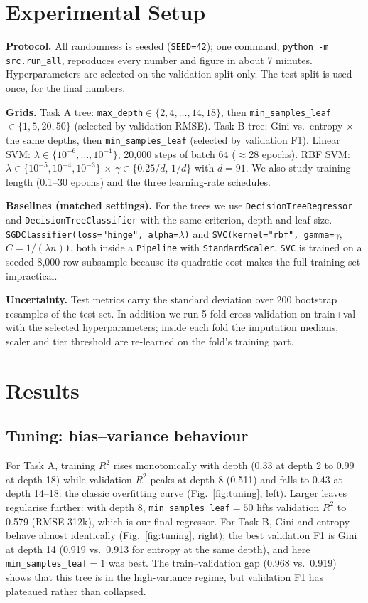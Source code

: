 \documentclass[10pt,twocolumn,a4paper]{article}
\begin{document}
\section{Experimental Setup}
\textbf{Protocol.} All randomness is seeded (\texttt{SEED=42}); one command,
\texttt{python -m src.run\_all}, reproduces every number and figure in
about 7 minutes. Hyperparameters are selected on the validation split only.
The test split is used once, for the final numbers.

\textbf{Grids.} Task A tree: \texttt{max\_depth}$\in\{2,4,\dots,14,18\}$,
then \texttt{min\_samples\_leaf}$\in\{1,5,20,50\}$ (selected by
validation RMSE). Task B tree: Gini vs.\ entropy $\times$ the same depths,
then \texttt{min\_samples\_leaf} (selected by validation F1). Linear SVM:
$\lambda\in\{10^{-6},\dots,10^{-1}\}$, 20{,}000 steps of batch 64
($\approx$28 epochs). RBF SVM: $\lambda\in\{10^{-5},10^{-4},10^{-3}\}$
$\times$ $\gamma\in\{0.25/d,\,1/d\}$ with $d=91$. We also study training
length (0.1--30 epochs) and the three learning-rate schedules.

\textbf{Baselines (matched settings).} For the trees we use
\texttt{DecisionTree\-Regressor} and \texttt{DecisionTree\-Classifier} with the same criterion, depth and leaf
size. \texttt{SGDClassifier(loss="hinge", alpha=}$\lambda$\texttt{)} and
\texttt{SVC(kernel="rbf", gamma=}$\gamma$, $C=1/(\lambda n)$\texttt{)},
both inside a \texttt{Pipeline} with \texttt{StandardScaler}. \texttt{SVC}
is trained on a seeded 8{,}000-row subsample because its quadratic cost
makes the full training set impractical.

\textbf{Uncertainty.} Test metrics carry the standard deviation over 200
bootstrap resamples of the test set. In addition we run 5-fold
cross-validation on train+val with the selected hyperparameters; inside each
fold the imputation medians, scaler and tier threshold are re-learned on
the fold's training part.

\section{Results}
\subsection{Tuning: bias--variance behaviour}
For Task A, training $R^2$ rises monotonically with depth (0.33 at depth 2
to 0.99 at depth 18) while validation $R^2$ peaks at depth 8 (0.511) and
falls to 0.43 at depth 14--18: the classic overfitting curve
(Fig.~\ref{fig:tuning}, left). Larger leaves regularise further: with
depth 8, \texttt{min\_samples\_leaf}$=50$ lifts validation $R^2$ to 0.579
(RMSE 312k), which is our final regressor. For Task B, Gini and entropy
behave almost identically (Fig.~\ref{fig:tuning}, right); the best
validation F1 is Gini at depth 14 (0.919 vs.\ 0.913 for entropy at the same
depth), and here \texttt{min\_samples\_leaf}$=1$ was best. The train--validation
gap (0.968 vs.\ 0.919) shows that this tree is in the high-variance regime,
but validation F1 has plateaued rather than collapsed.
\end{document}
